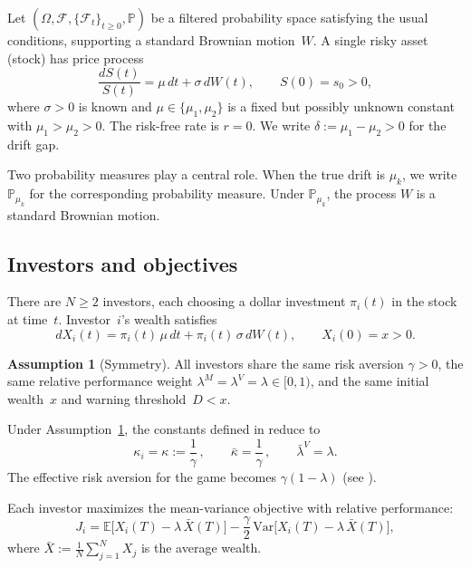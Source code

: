 \documentclass[12pt]{article}
\theoremstyle{remark}
\theoremstyle{definition}
\newtheorem{assumption}[theorem]{Assumption}
\newcommand{\E}{\mathbb{E}}
\newcommand{\Var}{\mathrm{Var}}
\newcommand{\Prob}{\mathbb{P}}
\begin{document}
Let $(\Omega, \mathcal{F}, \{\mathcal{F}_t\}_{t \ge 0}, \Prob)$ be a
filtered probability space satisfying the usual conditions, supporting
a standard Brownian motion~$W$.
A single risky asset (stock) has price process
\begin{equation}\label{eq:stock}
  \frac{dS(t)}{S(t)} = \mu\, dt + \sigma\, dW(t), \qquad S(0) = s_0 > 0,
\end{equation}
where $\sigma > 0$ is known and $\mu \in \{\mu_1, \mu_2\}$ is a fixed but
possibly unknown constant with $\mu_1 > \mu_2 > 0$.
The risk-free rate is $r = 0$.
We write $\delta := \mu_1 - \mu_2 > 0$ for the drift gap.

Two probability measures play a central role.
When the true drift is $\mu_k$, we write~$\Prob_{\mu_k}$ for the
corresponding probability measure.
Under $\Prob_{\mu_k}$, the process $W$ is a standard Brownian motion.

\subsection{Investors and objectives}\label{sec:investors}

There are $N \ge 2$ investors, each choosing a dollar investment
$\pi_i(t)$ in the stock at time~$t$.
Investor~$i$'s wealth satisfies
\begin{equation}\label{eq:wealth}
  dX_i(t) = \pi_i(t)\,\mu\,dt + \pi_i(t)\,\sigma\,dW(t),
  \qquad X_i(0) = x > 0.
\end{equation}

\begin{assumption}[Symmetry]\label{ass:sym}
All investors share the same risk aversion $\gamma > 0$,
the same relative performance weight
$\lambda^M = \lambda^V = \lambda \in [0,1)$,
and the same initial wealth~$x$ and warning threshold~$D < x$.
\end{assumption}

Under Assumption~\ref{ass:sym}, the constants defined in
\citet[Eq.~(3.6)--(3.7)]{HuangSun2025} reduce to
\begin{equation}\label{eq:kappa}
  \kappa_i = \kappa := \frac{1}{\gamma}\,,
  \qquad
  \bar{\kappa} = \frac{1}{\gamma}\,,
  \qquad
  \bar{\lambda}^V = \lambda.
\end{equation}
The effective risk aversion for the game becomes $\gamma(1-\lambda)$
(see \citet[Remark~3.4]{HuangSun2025}).

Each investor maximizes the mean-variance objective with relative
performance:
\begin{equation}\label{eq:objective}
  J_i = \E\bigl[X_i(T) - \lambda\,\bar{X}(T)\bigr]
      - \frac{\gamma}{2}\,\Var\bigl[X_i(T) - \lambda\,\bar{X}(T)\bigr],
\end{equation}
where $\bar{X} := \frac{1}{N}\sum_{j=1}^N X_j$ is the average wealth.
\end{document}
